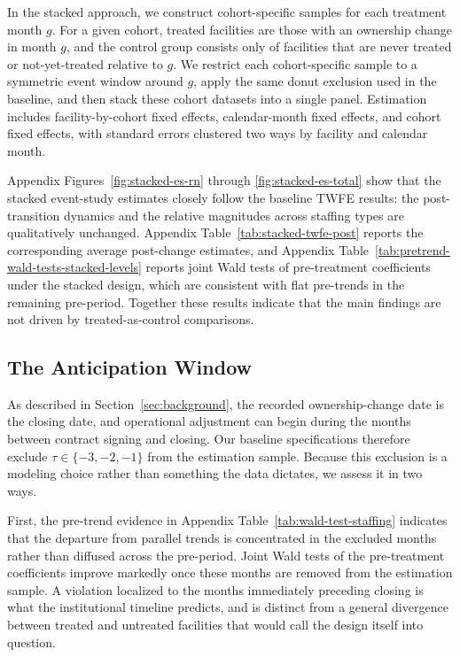 \documentclass[12pt]{article}
\begin{document}
In the stacked approach, we construct cohort-specific samples for each treatment month $g$. For a given cohort, treated facilities are those with an ownership change in month $g$, and the control group consists only of facilities that are never treated or not-yet-treated relative to $g$. We restrict each cohort-specific sample to a symmetric event window around $g$, apply the same donut exclusion used in the baseline, and then stack these cohort datasets into a single panel. Estimation includes facility-by-cohort fixed effects, calendar-month fixed effects, and cohort fixed effects, with standard errors clustered two ways by facility and calendar month.

Appendix Figures~\ref{fig:stacked-es-rn} through \ref{fig:stacked-es-total} show that the stacked event-study estimates closely follow the baseline TWFE results: the post-transition dynamics and the relative magnitudes across staffing types are qualitatively unchanged. Appendix Table~\ref{tab:stacked-twfe-post} reports the corresponding average post-change estimates, and Appendix Table~\ref{tab:pretrend-wald-tests-stacked-levels} reports joint Wald tests of pre-treatment coefficients under the stacked design, which are consistent with flat pre-trends in the remaining pre-period. Together these results indicate that the main findings are not driven by treated-as-control comparisons.

\subsection{The Anticipation Window}

As described in Section~\ref{sec:background}, the recorded ownership-change date is the closing date, and operational adjustment can begin during the months between contract signing and closing. Our baseline specifications therefore exclude $\tau\in\{-3,-2,-1\}$ from the estimation sample. Because this exclusion is a modeling choice rather than something the data dictates, we assess it in two ways.

First, the pre-trend evidence in Appendix Table~\ref{tab:wald-test-staffing} indicates that the departure from parallel trends is concentrated in the excluded months rather than diffused across the pre-period. Joint Wald tests of the pre-treatment coefficients improve markedly once these months are removed from the estimation sample. A violation localized to the months immediately preceding closing is what the institutional timeline predicts, and is distinct from a general divergence between treated and untreated facilities that would call the design itself into question.
\end{document}
